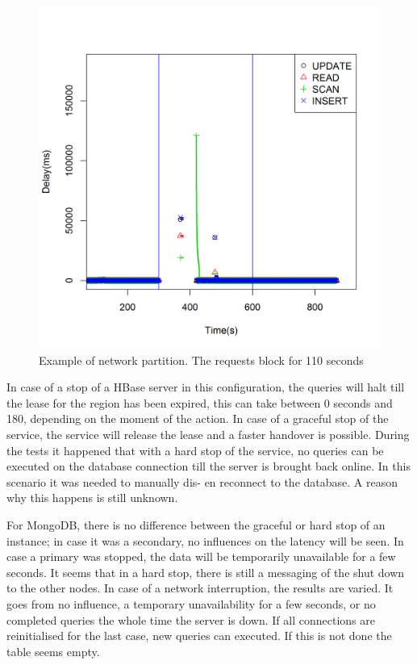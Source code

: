 \documentclass[10pt,conference,letterpaper]{IEEEtran}
\begin{document}
\begin{figure}[ht]
\centering
\includegraphics[width=\linewidth]{img/HBase/single-graph-2-drop-1}
\caption{Example of network partition. The requests block for 110 seconds }
\end{figure}

In case of a stop of a HBase server in this configuration, the queries will halt till the lease for the region has been expired, this can take between 0 seconds and 180, depending on the moment of the action. In case of a graceful stop of the service, the service will release the lease and a faster handover is possible. During the tests it happened that with a hard stop of the service, no queries can be executed on the database connection till the server is brought back online. In this scenario it was needed to manually dis- en reconnect to the database. A reason why this happens is still unknown.

For MongoDB, there is no difference between the graceful or hard stop of an instance; in case it was a secondary, no influences on the latency will be seen. In case a primary was stopped, the data will be temporarily unavailable for a few seconds. It seems that in a hard stop, there is still a messaging of the shut down to the other nodes. In case of a network interruption, the results are varied. It goes from no influence, a temporary unavailability for a few seconds, or no completed queries the whole time the server is down. If all connections are reinitialised for the last case, new queries can executed. If this is not done the table seems empty. 
\end{document}
